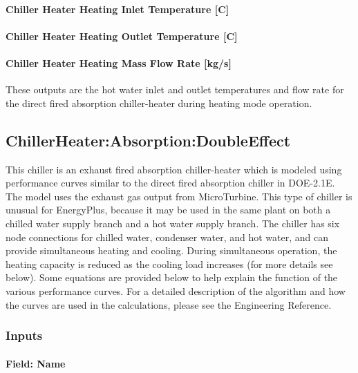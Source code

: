 \paragraph{Chiller Heater Heating Inlet Temperature {[}C{]}}\label{chiller-heater-heating-inlet-temperature-c}

\paragraph{Chiller Heater Heating Outlet Temperature {[}C{]}}\label{chiller-heater-heating-outlet-temperature-c}

\paragraph{Chiller Heater Heating Mass Flow Rate {[}kg/s{]}}\label{chiller-heater-heating-mass-flow-rate-kgs}

These outputs are the hot water inlet and outlet temperatures and flow rate for the direct fired absorption chiller-heater during heating mode operation.

\subsection{ChillerHeater:Absorption:DoubleEffect}\label{chillerheaterabsorptiondoubleeffect}

This chiller is an exhaust fired absorption chiller-heater which is modeled using performance curves similar to the direct fired absorption chiller in DOE-2.1E. The model uses the exhaust gas output from MicroTurbine. This type of chiller is unusual for EnergyPlus, because it may be used in the same plant on both a chilled water supply branch and a hot water supply branch. The chiller has six node connections for chilled water, condenser water, and hot water, and can provide simultaneous heating and cooling. During simultaneous operation, the heating capacity is reduced as the cooling load increases (for more details see below). Some equations are provided below to help explain the function of the various performance curves. For a detailed description of the algorithm and how the curves are used in the calculations, please see the Engineering Reference.

\subsubsection{Inputs}\label{inputs-9-014}

\paragraph{Field: Name}\label{field-name-8-014}

